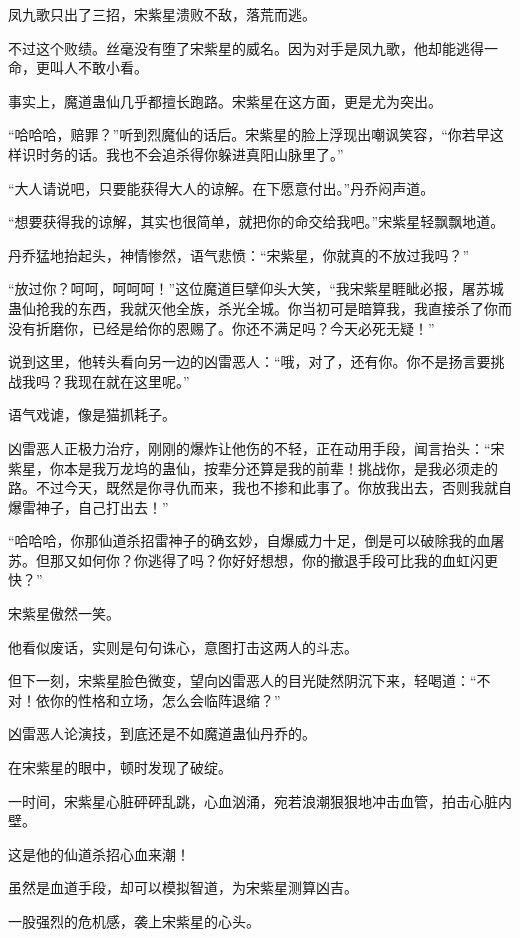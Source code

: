 \begin{this_body}
凤九歌只出了三招，宋紫星溃败不敌，落荒而逃。

不过这个败绩。丝毫没有堕了宋紫星的威名。因为对手是凤九歌，他却能逃得一命，更叫人不敢小看。

事实上，魔道蛊仙几乎都擅长跑路。宋紫星在这方面，更是尤为突出。

“哈哈哈，赔罪？”听到烈魔仙的话后。宋紫星的脸上浮现出嘲讽笑容，“你若早这样识时务的话。我也不会追杀得你躲进真阳山脉里了。”

“大人请说吧，只要能获得大人的谅解。在下愿意付出。”丹乔闷声道。

“想要获得我的谅解，其实也很简单，就把你的命交给我吧。”宋紫星轻飘飘地道。

丹乔猛地抬起头，神情惨然，语气悲愤：“宋紫星，你就真的不放过我吗？”

“放过你？呵呵，呵呵呵！”这位魔道巨擘仰头大笑，“我宋紫星睚眦必报，屠苏城蛊仙抢我的东西，我就灭他全族，杀光全城。你当初可是暗算我，我直接杀了你而没有折磨你，已经是给你的恩赐了。你还不满足吗？今天必死无疑！”

说到这里，他转头看向另一边的凶雷恶人：“哦，对了，还有你。你不是扬言要挑战我吗？我现在就在这里呢。”

语气戏谑，像是猫抓耗子。

凶雷恶人正极力治疗，刚刚的爆炸让他伤的不轻，正在动用手段，闻言抬头：“宋紫星，你本是我万龙坞的蛊仙，按辈分还算是我的前辈！挑战你，是我必须走的路。不过今天，既然是你寻仇而来，我也不掺和此事了。你放我出去，否则我就自爆雷神子，自己打出去！”

“哈哈哈，你那仙道杀招雷神子的确玄妙，自爆威力十足，倒是可以破除我的血屠苏。但那又如何你？你逃得了吗？你好好想想，你的撤退手段可比我的血虹闪更快？”

宋紫星傲然一笑。

他看似废话，实则是句句诛心，意图打击这两人的斗志。

但下一刻，宋紫星脸色微变，望向凶雷恶人的目光陡然阴沉下来，轻喝道：“不对！依你的性格和立场，怎么会临阵退缩？”

凶雷恶人论演技，到底还是不如魔道蛊仙丹乔的。

在宋紫星的眼中，顿时发现了破绽。

一时间，宋紫星心脏砰砰乱跳，心血汹涌，宛若浪潮狠狠地冲击血管，拍击心脏内壁。

这是他的仙道杀招心血来潮！

虽然是血道手段，却可以模拟智道，为宋紫星测算凶吉。

一股强烈的危机感，袭上宋紫星的心头。


\end{this_body}
